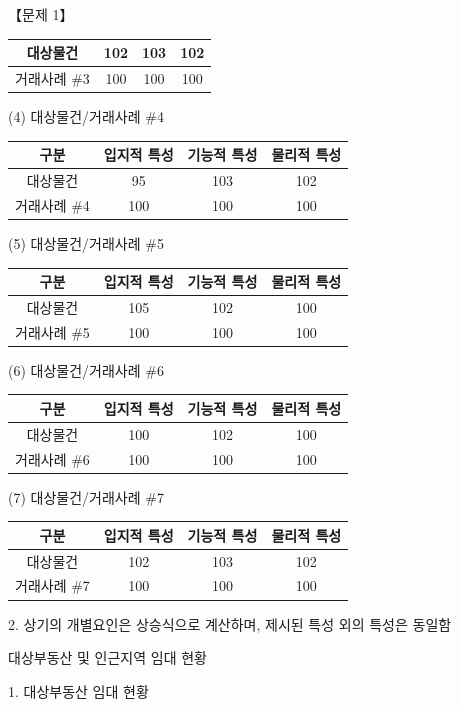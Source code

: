 \begin{longquestion}{【문제 1】}
{\begin{tabular}{|c|c|c|c|}
대상물건 & 102 & 103 & 102 \\\hline
거래사례 \#3 & 100 & 100 & 100 \\\hline
\end{tabular}\par}
(4) 대상물건/거래사례 \#4 \par
{\small\centering
\begin{tabular}{|c|c|c|c|}\hline
구분 & 입지적 특성 & 기능적 특성 & 물리적 특성 \\\hline
대상물건 & 95 & 103 & 102 \\\hline
거래사례 \#4 & 100 & 100 & 100 \\\hline
\end{tabular}\par}
(5) 대상물건/거래사례 \#5 \par
{\small\centering
\begin{tabular}{|c|c|c|c|}\hline
구분 & 입지적 특성 & 기능적 특성 & 물리적 특성 \\\hline
대상물건 & 105 & 102 & 100 \\\hline
거래사례 \#5 & 100 & 100 & 100 \\\hline
\end{tabular}\par}
(6) 대상물건/거래사례 \#6 \par
{\small\centering
\begin{tabular}{|c|c|c|c|}\hline
구분 & 입지적 특성 & 기능적 특성 & 물리적 특성 \\\hline
대상물건 & 100 & 102 & 100 \\\hline
거래사례 \#6 & 100 & 100 & 100 \\\hline
\end{tabular}\par}
(7) 대상물건/거래사례 \#7 \par
{\small\centering
\begin{tabular}{|c|c|c|c|}\hline
구분 & 입지적 특성 & 기능적 특성 & 물리적 특성 \\\hline
대상물건 & 102 & 103 & 102 \\\hline
거래사례 \#7 & 100 & 100 & 100 \\\hline
\end{tabular}\par}
2. 상기의 개별요인은 상승식으로 계산하며, 제시된 특성 외의 특성은 동일함 \par
\medskip{} 대상부동산 및 인근지역 임대 현황 \par
1. 대상부동산 임대 현황 \par

\end{longquestion}
